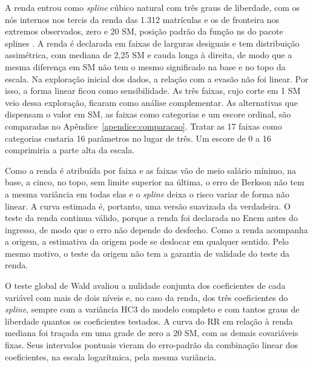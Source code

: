 \documentclass[12pt,a4paper]{article}
\begin{document}
A renda entrou como \textit{spline} cúbico natural com três graus de liberdade, com os nós internos nos tercis da renda das 1.312 matrículas e os de fronteira nos extremos observados, zero e 20 SM, posição padrão da função ns do pacote splines \citep[p.~195]{fox2019companion}. A renda é declarada em faixas de larguras desiguais e tem distribuição assimétrica, com mediana de 2,25 SM e cauda longa à direita, de modo que a mesma diferença em SM não tem o mesmo significado na base e no topo da escala. Na exploração inicial dos dados, a relação com a evasão não foi linear. Por isso, a forma linear ficou como sensibilidade. As três faixas, cujo corte em 1 SM veio dessa exploração, ficaram como análise complementar. As alternativas que dispensam o valor em SM, as faixas como categorias e um escore ordinal, são comparadas no Apêndice~\ref{apendice:comparacao}. Tratar as 17 faixas como categorias custaria 16 parâmetros no lugar de três. Um escore de 0 a 16 comprimiria a parte alta da escala.

Como a renda é atribuída por faixa e as faixas vão de meio salário mínimo, na base, a cinco, no topo, sem limite superior na última, o erro de Berkson não tem a mesma variância em todas elas e o \textit{spline} deixa o risco variar de forma não linear. A curva estimada é, portanto, uma versão suavizada da verdadeira. O teste da renda continua válido, porque a renda foi declarada no Enem antes do ingresso, de modo que o erro não depende do desfecho. Como a renda acompanha a origem, a estimativa da origem pode se deslocar em qualquer sentido. Pelo mesmo motivo, o teste da origem não tem a garantia de validade do teste da renda.

O teste global de Wald avaliou a nulidade conjunta dos coeficientes de cada variável com mais de dois níveis e, no caso da renda, dos três coeficientes do \textit{spline}, sempre com a variância HC3 do modelo completo e com tantos graus de liberdade quantos os coeficientes testados. A curva do RR em relação à renda mediana foi traçada em uma grade de zero a 20 SM, com as demais covariáveis fixas. Seus intervalos pontuais vieram do erro-padrão da combinação linear dos coeficientes, na escala logarítmica, pela mesma variância.
\end{document}
